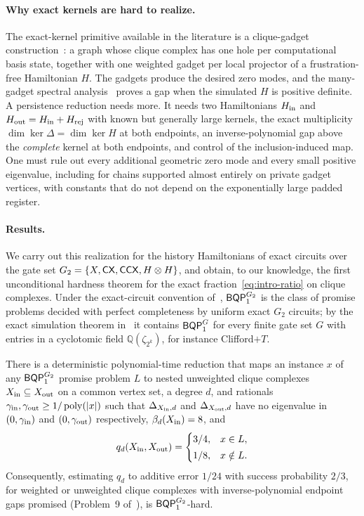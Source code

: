 \paragraph{Why exact kernels are hard to realize.}
The exact-kernel primitive available in the literature is a clique-gadget construction~\cite{crichigno2024clique,king2026gapped}: a graph whose clique complex has one hole per computational basis state, together with one weighted gadget per local projector of a frustration-free Hamiltonian \(H\). The gadgets produce the desired zero modes, and the many-gadget spectral analysis~\cite{king2026gapped} proves a gap when the simulated \(H\) is positive definite. A persistence reduction needs more. It needs two Hamiltonians \(H_{\rm in}\) and \(H_{\rm out}=H_{\rm in}+H_{\rm rej}\) with known but generally large kernels, the exact multiplicity \(\dim\ker\Delta=\dim\ker H\) at both endpoints, an inverse-polynomial gap above the \emph{complete} kernel at both endpoints, and control of the inclusion-induced map. One must rule out every additional geometric zero mode and every small positive eigenvalue, including for chains supported almost entirely on private gadget vertices, with constants that do not depend on the exponentially large padded register.

\paragraph{Results.}
We carry out this realization for the history Hamiltonians of exact circuits over the gate set \(G_2=\{X,\mathsf{CX},\mathsf{CCX},H\otimes H\}\), and obtain, to our knowledge, the first unconditional hardness theorem for the exact fraction~\eqref{eq:intro-ratio} on clique complexes. Under the exact-circuit convention of~\cite{rudolph2026universal}, \(\mathsf{BQP}_{1}^{G_2}\) is the class of promise problems decided with perfect completeness by uniform exact \(G_2\) circuits; by the exact simulation theorem in~\cite{rudolph2026universal} it contains \(\mathsf{BQP}_{1}^{G}\) for every finite gate set \(G\) with entries in a cyclotomic field \(\mathbb Q(\zeta_{2^k})\), for instance Clifford\(+T\).

\begin{theorem}
\label{thm:intro-main}
There is a deterministic polynomial-time reduction that maps an instance \(x\) of any \(\mathsf{BQP}_{1}^{G_2}\) promise problem \(L\) to nested unweighted clique complexes \(X_{\mathrm{in}}\subseteq X_{\mathrm{out}}\) on a common vertex set, a degree \(d\), and rationals \(\gamma_{\rm in},\gamma_{\rm out}\ge1/\operatorname{poly}(|x|)\) such that \(\Delta_{X_{\mathrm{in}},d}\) and \(\Delta_{X_{\mathrm{out}},d}\) have no eigenvalue in \((0,\gamma_{\rm in})\) and \((0,\gamma_{\rm out})\) respectively, \(\beta_d(X_{\mathrm{in}})=8\), and
\[
q_d(X_{\mathrm{in}},X_{\mathrm{out}})=\begin{cases}3/4,&x\in L,\\[2pt] 1/8,&x\notin L.\end{cases}
\]
Consequently, estimating \(q_d\) to additive error \(1/24\) with success probability \(2/3\), for weighted or unweighted clique complexes with inverse-polynomial endpoint gaps promised (Problem~9 of~\cite{lowe2026normalized}), is \(\mathsf{BQP}_{1}^{G_2}\)-hard.
\end{theorem}

